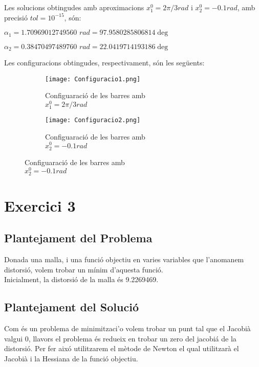 \documentclass{article}
\begin{document}
Les solucions obtingudes amb aproximacions $x^{0}_{1} = 2\pi/3 rad$ i $x^{0}_{2} = -0.1 rad$, amb precisió $tol = 10^{-15}$, són:

$\alpha_1 = 1.70969012749560 \hspace{4pt}rad = 97.9580285806814 \deg$

$\alpha_2 = 0.38470497489760 \hspace{4pt}rad = 22.0419714193186 \deg$

Les configuracions obtingudes, respectivament, són les següents:


\begin{figure}[ht]
  \centering
  \begin{subfigure}[H]{0.49\linewidth}
    \texttt{[image: Configuracio1.png]}
    \caption{Configuaraci\'o de les barres amb\\ $x^{0}_{1} = 2\pi/3 rad$}
  \end{subfigure}
  \begin{subfigure}[H]{0.49\linewidth}
    \texttt{[image: Configuracio2.png]}
    \caption{Configuaraci\'o de les barres amb\\ $x^{0}_{2} = -0.1 rad$}
  \end{subfigure}
  \label{fig:Configuracions}
\end{figure}



\newpage

\section*{Exercici 3}
\subsection*{Plantejament del Problema}
\quad Donada una malla, i una funci\'o objectiu en varies variables que l'anomanem distorsi\'o, volem trobar un m\'inim d'aquesta funci\'o.\\
\quad Inicialment, la distorsi\'o de la malla \'es 9.2269469.

\subsection*{Plantejament del Soluci\'o}

Com \'es un problema de minimitzaci'o volem trobar un punt tal que el Jacobi\`a valgui 0, llavors el problema \'es redueix en trobar un zero del jacobi\'a de la distorsi\'o. Per fer aix\'o utilitzarem el m\`etode de Newton el qual utilitzar\`a el Jacobi\`a i la Hessiana de la funci\'o objectiu.
\end{document}

